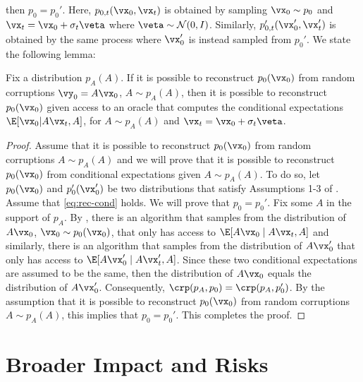 \documentclass{article}
\begin{document}
then $p_0 = p_0'$. Here, $p_{0,t}(\vx_0,\vx_t)$ is obtained by sampling $\vx_0 \sim p_0$ and $\vx_t = \vx_0 + \sigma_t \veta$ where $\veta \sim \mathcal{N}(0,I)$. Similarly, $p'_{0,t}(\vx_0',\vx_t')$ is obtained by the same process where $\vx_0'$ is instead sampled from $p_0'$.
We state the following lemma:
\begin{lemma}
    Fix a distribution $p_A(A)$. If it is possible to reconstruct $p_0(\vx_0)$ from random corruptions $\vy_0 = A\vx_0$, $A \sim p_A(A)$, then it is possible to reconstruct $p_0(\vx_0)$ given access to an oracle that computes the conditional expectations $\E[\vx_0 | A\vx_t, A]$, for $A \sim p_A(A)$ and $\vx_t = \vx_0 + \sigma_t \veta$.
    \label{lemma:reduction}
\end{lemma}
\begin{proof}
    Assume that it is possible to reconstruct $p_0(\vx_0)$ from random corruptions $A \sim p_A(A)$ and we will prove that it is possible to reconstruct $p_0(\vx_0)$ from conditional expectations given $A \sim p_A(A)$. To do so, let $p_0(\vx_0)$ and $p_0'(\vx_0')$ be two distributions that satisfy Assumptions 1-3 of \citet{chen2022sampling}. Assume that \eqref{eq:rec-cond} holds. We will prove that $p_0 = p_0'$. Fix some $A$ in the support of $p_A$. By \citet{chen2022sampling}, there is an algorithm that samples from the distribution of $A\vx_0$, $\vx_0 \sim p_0(\vx_0)$, that only has access to $\E[A\vx_0 \mid A\vx_t, A]$ and similarly, there is an algorithm that samples from the distribution of $A\vx_0'$ that only has access to $\E[A\vx_0' \mid A\vx_t', A]$. Since these two conditional expectations are assumed to be the same, then the distribution of $A\vx_0$ equals the distribution of $A\vx_0'$. Consequently, $\crp(p_A,p_0) = \crp(p_A,p_0')$. By the assumption that it is possible to reconstruct $p_0(\vx_0)$ from random corruptions $A \sim p_A(A)$, this implies that $p_0 = p_0'$. This completes the proof.
\end{proof}


\section{Broader Impact and Risks}
\end{document}
